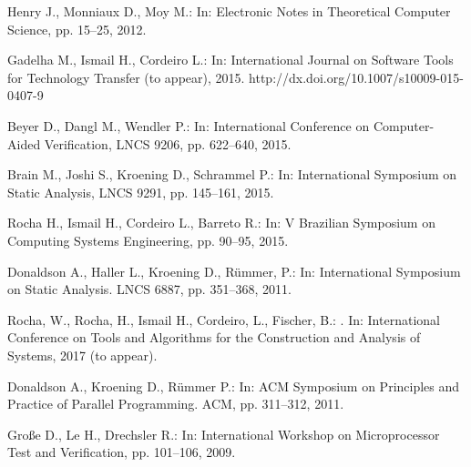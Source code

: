 \documentclass{acm_sen_article}
\begin{document}
{\begin{thebibliography}{1}
Henry J., Monniaux D., Moy M.: 
\newblock In: Electronic Notes in Theoretical Computer Science, pp. 15--25, 2012.

Gadelha M., Ismail H., Cordeiro L.:
\newblock In: International Journal on Software Tools for Technology Transfer (to appear), 2015.
\newblock http://dx.doi.org/10.1007/s10009-015-0407-9

Beyer D., Dangl M., Wendler P.:
\newblock In: International Conference on Computer-Aided Verification, LNCS 9206, pp. 622--640, 2015.

Brain M., Joshi S., Kroening D., Schrammel P.:
\newblock In: International Symposium on Static Analysis, LNCS 9291, pp. 145--161, 2015.

Rocha H., Ismail H., Cordeiro L., Barreto R.:
\newblock In: V Brazilian Symposium on Computing Systems Engineering, pp. 90--95, 2015.

Donaldson A., Haller L., Kroening D., R{\"{u}}mmer, P.:
\newblock In: International Symposium on Static Analysis. LNCS 6887, pp. 351--368, 2011.

Rocha, W., Rocha, H., Ismail H., Cordeiro, L., Fischer, B.:
. 
\newblock In: International Conference on Tools and Algorithms for the Construction and Analysis of Systems, 2017 (to appear).

Donaldson A., Kroening D., R{\"{u}}mmer P.:
\newblock In: ACM Symposium on Principles and Practice of Parallel Programming. ACM, pp. 311--312, 2011.

Gro{\ss}e D., Le H., Drechsler R.:
\newblock In: International Workshop on Microprocessor Test and Verification, pp. 101--106, 2009.


\end{thebibliography}}
\end{document}
